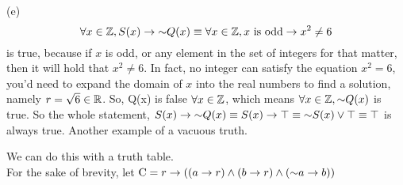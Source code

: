 \documentclass[a4paper, 11pt]{report}
\begin{document}
\sol (e) 
$$
  \forall x\in\mathbb{Z}, S(x)\rightarrow\mathord{\sim} Q(x) \equiv \forall x\in\mathbb{Z}, x \text{ is odd}\rightarrow x^2 \neq 6
$$
is true, because if $x$ is odd, or any element in the set of integers for that matter, then it will hold that $x^2\neq 6$. In fact, no integer can satisfy the equation $x^2=6$, you'd need to expand the domain of $x$ into the real numbers to find a solution, namely $r=\sqrt{6}\in\mathbb{R}$. So, Q(x) is false $\forall x\in\mathbb{Z}$, which means $\forall x\in\mathbb{Z},\mathord{\sim} Q(x)$ is true. So the whole statement, $S(x)\rightarrow\mathord{\sim} Q(x)\equiv S(x)\rightarrow\top\equiv \mathord{\sim} S(x)\lor \top\equiv\top$ is always true. Another example of a vacuous truth.

\pagebreak

\sol We can do this with a truth table. \\ For the sake of brevity, let $\mathrm{C} = r \rightarrow ((a\rightarrow r)\land(b\rightarrow r)\land(\mathord{\sim} a\rightarrow b))$
\end{document}
